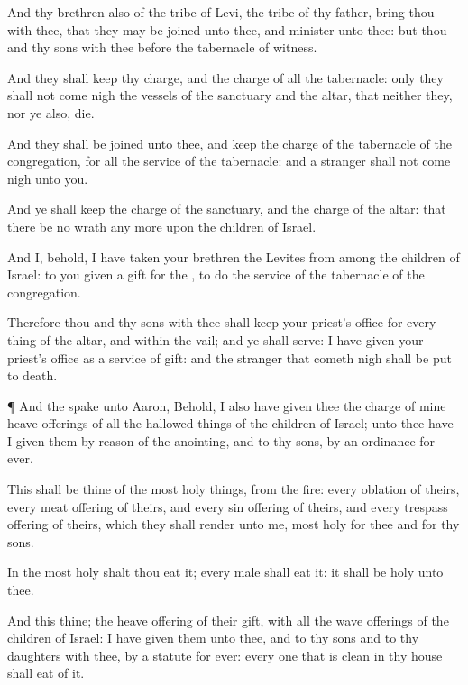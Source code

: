 {And thy
brethren also of the
tribe of
Levi, the
tribe of thy
father,
bring thou with thee, that they may be
joined unto thee, and
minister unto thee: but thou and thy
sons with thee
{}
before the
tabernacle of
witness.

And they shall
keep thy
charge, and the
charge of all the
tabernacle: only they shall not come
nigh the
vessels of the
sanctuary and the
altar, that neither they, nor ye also,
die.

And they shall be
joined unto thee, and
keep the
charge of the
tabernacle of the
congregation, for all the
service of the
tabernacle: and a
stranger shall not come
nigh unto you.

And ye shall
keep the
charge of the
sanctuary, and the
charge of the
altar: that there be no
wrath any more upon the
children of
Israel.

And I, behold, I have
taken your
brethren the
Levites from
among the
children of
Israel: to you
{}
given
{} a
gift for the
{}, to
do the
service of the
tabernacle of the
congregation.

Therefore thou and thy
sons with thee shall
keep your
priest’s office for every
thing of the
altar, and
within the
vail; and ye shall
serve: I have
given your
priest’s office
{} as a
service of
gift: and the
stranger that cometh
nigh shall be put to
death.


\par }{\PP {}¶ And the
{}
spake unto
Aaron, Behold, I also have
given thee the
charge of mine heave
offerings of all the hallowed
things of the
children of
Israel; unto thee have I
given them by reason of the
anointing, and to thy
sons, by an
ordinance for
ever.

This shall be thine of the
most holy
things,
{} from the
fire: every
oblation of theirs, every meat
offering of theirs, and every sin
offering of theirs, and every trespass
offering of theirs, which they shall
render unto me,
{}
most
holy for thee and for thy
sons.

In the
most
holy
{} shalt thou
eat it; every
male shall
eat it: it shall be
holy unto thee.

And this
{} thine; the heave
offering of their
gift, with all the wave
offerings of the
children of
Israel: I have
given them unto thee, and to thy
sons and to thy
daughters with thee, by a
statute for
ever: every one that is
clean in thy
house shall
eat of it.

}
